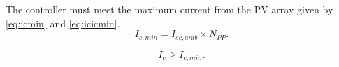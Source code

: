 \documentclass[journal]{IEEEtran}
\begin{document}
The controller must meet the maximum current from the PV array given by \eqref{eq:icmin} and \eqref{eq:icicmin}.
\begin{equation}
\label{eq:icmin}
I_{c,min} = I_{sc,amb} \times N_{PP}.
\end{equation}

\begin{equation}
\label{eq:icicmin}
I_{c} \geq I_{c,min}.
\end{equation}

%
%
%
%
\end{document}
